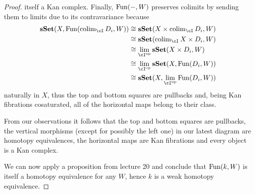 \documentclass[a4paper,11pt,openany]{scrartcl}
\begin{document}
\begin{proof}
    itself a Kan complex. Finally, $\operatorname{Fun}(-,W)$ preserves colimits by sending
    them to limits due to its contravariance because
    \begin{align*}
        \sSet(X,\Fun(\colim_{\cI}D_i,W))
        &\cong\sSet(X\times\colim_{\cI}D_i,W) \\
        &\cong\sSet(\colim_{\cI} X\times D_i,W) \\
        &\cong\lim_{\cI^{\op}}\sSet(X\times D_i,W) \\
        &\cong\lim_{\cI^{\op}}\sSet(X,\Fun(D_i,W)) \\
        &\cong\sSet(X,\lim_{\cI^{\op}}\Fun(D_i,W))
    \end{align*}
    naturally in $X$,
    thus the top and bottom squares are pullbacks and, being Kan fibrations
    cosaturated, all of the horizontal maps belong to their class.

    From our observations it follows that the top and bottom squares are
    pullbacks, the vertical morphisms (except for possibly the left one) in our
    latest diagram are homotopy equivalences, the horizontal maps are Kan
    fibrations and every object is a Kan complex.

    We can now apply a proposition from lecture 20 and conclude that $\operatorname{Fun}(k,W)$
    is itself a homotopy equivalence for any $W$, hence $k$ is a weak homotopy
    equivalence.
\end{proof}
\end{document}
